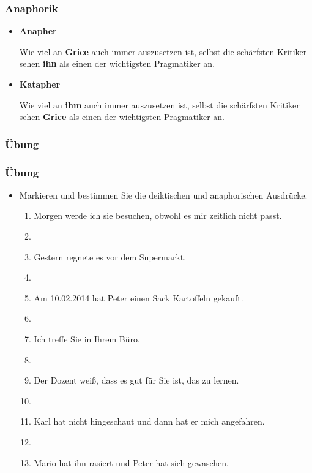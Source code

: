 
\begin{frame}
\frametitle{Anaphorik}

\begin{itemize}
	\item \textbf{Anapher}
	
	\ea Wie viel an \textbf{Grice} auch immer auszusetzen ist, selbst die schärfsten Kritiker sehen \textbf{ihn} als einen der wichtigsten Pragmatiker an.
	\z
	
	\item \textbf{Katapher}
	
	\ea Wie viel an \textbf{ihm} auch immer auszusetzen ist, selbst die schärfsten Kritiker sehen \textbf{Grice} als einen der wichtigsten Pragmatiker an.
	\z
	
\end{itemize}

\end{frame}


%
\subsubsection{Übung}
%

\begin{frame}
\frametitle{Übung}

\begin{itemize}
	\item Markieren und bestimmen Sie die deiktischen und anaphorischen Ausdrücke.
	
	\begin{enumerate}
	\item Morgen werde ich sie besuchen, obwohl es mir zeitlich nicht passt.
	\item[]
	\item Gestern regnete es vor dem Supermarkt.
	\item[]
	\item Am 10.02.2014 hat Peter einen Sack Kartoffeln gekauft.
	\item[]
	\item Ich treffe Sie in Ihrem Büro.
	\item[]
	\item Der Dozent wei\ss{}, dass es gut für Sie ist, das zu lernen.
	\item[]
	\item Karl hat nicht hingeschaut und dann hat er mich angefahren.
	\item[]
	\item Mario hat ihn rasiert und Peter hat sich gewaschen.
	\end{enumerate}
	
\end{itemize}

\end{frame}


